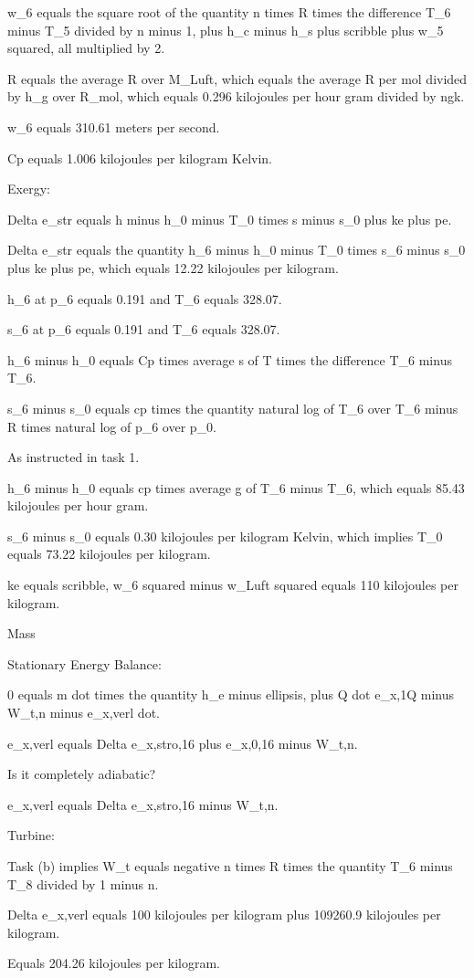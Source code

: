w_6 equals the square root of the quantity n times R times the difference T_6 minus T_5 divided by n minus 1, plus h_c minus h_s plus scribble plus w_5 squared, all multiplied by 2.

R equals the average R over M_Luft, which equals the average R per mol divided by h_g over R_mol, which equals 0.296 kilojoules per hour gram divided by ngk.

w_6 equals 310.61 meters per second.

Cp equals 1.006 kilojoules per kilogram Kelvin.

Exergy:

Delta e_str equals h minus h_0 minus T_0 times s minus s_0 plus ke plus pe.

Delta e_str equals the quantity h_6 minus h_0 minus T_0 times s_6 minus s_0 plus ke plus pe, which equals 12.22 kilojoules per kilogram.

h_6 at p_6 equals 0.191 and T_6 equals 328.07.

s_6 at p_6 equals 0.191 and T_6 equals 328.07.

h_6 minus h_0 equals Cp times average s of T times the difference T_6 minus T_6.

s_6 minus s_0 equals cp times the quantity natural log of T_6 over T_6 minus R times natural log of p_6 over p_0.

As instructed in task 1.

h_6 minus h_0 equals cp times average g of T_6 minus T_6, which equals 85.43 kilojoules per hour gram.

s_6 minus s_0 equals 0.30 kilojoules per kilogram Kelvin, which implies T_0 equals 73.22 kilojoules per kilogram.

ke equals scribble, w_6 squared minus w_Luft squared equals 110 kilojoules per kilogram.

Mass

Stationary Energy Balance:

0 equals m dot times the quantity h_e minus ellipsis, plus Q dot e_x,1Q minus W_t,n minus e_x,verl dot.

e_x,verl equals Delta e_x,stro,16 plus e_x,0,16 minus W_t,n.

Is it completely adiabatic?

e_x,verl equals Delta e_x,stro,16 minus W_t,n.

Turbine:

Task (b) implies W_t equals negative n times R times the quantity T_6 minus T_8 divided by 1 minus n.

Delta e_x,verl equals 100 kilojoules per kilogram plus 109260.9 kilojoules per kilogram.

Equals 204.26 kilojoules per kilogram.